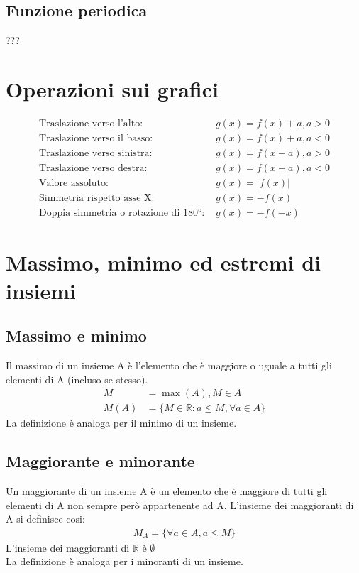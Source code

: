 \documentclass[12pt,a4paper]{article}
\let\oldsection\section
\renewcommand{\section}{\clearpage\oldsection}
\begin{document}
\subsection{Funzione periodica}
???

\section{Operazioni sui grafici}
\begin{align*}
\text{Traslazione verso l'alto: } & g(x)=f(x)+a, a>0 \\
\text{Traslazione verso il basso: } & g(x)=f(x)+a, a<0 \\
\text{Traslazione verso sinistra: } & g(x)=f(x+a), a>0 \\
\text{Traslazione verso destra: } & g(x)=f(x+a), a<0 \\
\text{Valore assoluto: } & g(x)=|f(x)| \\
\text{Simmetria rispetto asse X: } & g(x)=-f(x) \\
\text{Doppia simmetria o rotazione di 180°: } & g(x)=-f(-x)
\end{align*}

\section{Massimo, minimo ed estremi di insiemi}
\subsection{Massimo e minimo}
Il massimo di un insieme A è l'elemento che è maggiore o uguale a tutti gli elementi di A (incluso se stesso). 
\begin{align*}
M&=\max(A), M \in A \\
M(A) &= \{ M \in \mathbb{R} : a \le M, \forall a \in A \}
\end{align*}
La definizione è analoga per il minimo di un insieme.

\subsection{Maggiorante e minorante}
Un maggiorante di un insieme A è un elemento che è maggiore di tutti gli elementi di A non sempre però appartenente ad A.
L'insieme dei maggioranti di A si definisce cosi:
\begin{align*}
    M_A = \{\forall a \in A, a \le M\}
\end{align*}
L'insieme dei maggioranti di $\mathbb{R}$ è $\emptyset$\\
La definizione è analoga per i minoranti di un insieme.
\end{document}
